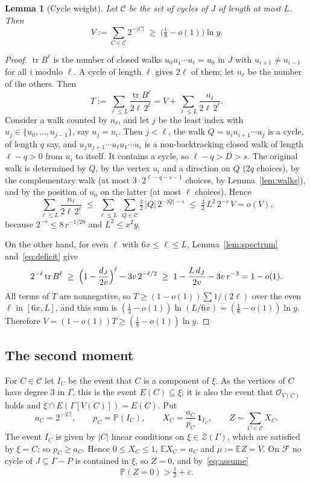 \documentclass[11pt]{article}
\newtheorem{lemma}[theorem]{Lemma}
\theoremstyle{definition}
\theoremstyle{remark}
\newcommand{\Z}{\mathcal{Z}}
\newcommand{\PP}{\mathbb{P}}
\newcommand{\EE}{\mathbb{E}}
\newcommand{\tr}{\operatorname{tr}}
\newcommand{\cO}{\mathcal{O}}
\begin{document}
\begin{lemma}[Cycle weight]\label{lem:weight}
Let $\mathcal{C}$ be the set of cycles of $J$ of length at most $L$. Then
\[
  V:=\sum_{C\in\mathcal{C}}2^{-|C|}\;\ge\;\bigl(\tfrac18-o(1)\bigr)\ln y .
\]
\end{lemma}

\begin{proof}
$\tr B^{\ell}$ is the number of closed walks $u_0u_1\cdots u_\ell=u_0$ in $J$ with
$u_{i+1}\ne u_{i-1}$ for all $i$ modulo $\ell$. A cycle of length $\ell$ gives $2\ell$ of them; let
$n_\ell$ be the number of the others. Then
\[
  T:=\sum_{\ell\le L}\frac{\tr B^{\ell}}{2\ell\,2^{\ell}}=V+\sum_{\ell\le L}\frac{n_\ell}{2\ell\,2^{\ell}} .
\]
Consider a walk counted by $n_\ell$, and let $j$ be the least index with
$u_j\in\{u_0,\dots,u_{j-1}\}$, say $u_j=u_i$. Then $j<\ell$, the walk $Q=u_iu_{i+1}\cdots u_j$ is a
cycle, of length $q$ say, and $u_ju_{j+1}\cdots u_\ell u_1\cdots u_i$ is a non-backtracking closed
walk of length $\ell-q>0$ from $u_i$ to itself. It contains a cycle, so $\ell-q>D>s$. The original
walk is determined by $Q$, by the vertex $u_i$ and a direction on $Q$ ($2q$ choices), by the
complementary walk (at most $3\cdot2^{\ell-q-s-1}$ choices, by Lemma~\ref{lem:walks}), and by the
position of $u_0$ on the latter (at most $\ell$ choices). Hence
\[
  \sum_{\ell\le L}\frac{n_\ell}{2\ell\,2^{\ell}}
  \;\le\;\sum_{\ell\le L}\ \sum_{Q\in\mathcal{C}}\tfrac32\,|Q|\,2^{-|Q|-s}
  \;\le\;\tfrac32\,L^{2}\,2^{-s}\,V=o(V),
\]
because $2^{-s}\le8\,r^{-1/20}$ and $L^{2}\le x^{2}y$.

On the other hand, for even $\ell$ with $6x\le\ell\le L$, Lemma~\ref{lem:spectrum}
and~\eqref{eq:deficit} give
\[
  2^{-\ell}\tr B^{\ell}\;\ge\;\Bigl(1-\frac{d_J}{2v}\Bigr)^{\ell}-3v\,2^{-\ell/2}
  \;\ge\;1-\frac{L\,d_J}{2v}-3v\,r^{-3}=1-o(1).
\]
All terms of $T$ are nonnegative, so $T\ge(1-o(1))\sum1/(2\ell)$ over the even $\ell$ in $[6x,L]$,
and this sum is $(\frac14-o(1))\ln(L/6x)=(\frac18-o(1))\ln y$. Therefore
$V=(1-o(1))T\ge(\frac18-o(1))\ln y$.
\end{proof}

\subsection{The second moment}

For $C\in\mathcal{C}$ let $I_C$ be the event that $C$ is a component of $\xi$. As the vertices of
$C$ have degree $3$ in $\Gamma$, this is the event $E(C)\subseteq\xi$; it is also the event that
$\cO_{V(C)}$ holds and $\xi\cap E(\Gamma[V(C)])=E(C)$. Put
\[
  a_C=2^{-|C|},\qquad p_C=\PP(I_C),\qquad X_C=\frac{a_C}{p_C}\,\mathbf{1}_{I_C},\qquad
  Z=\sum_{C\in\mathcal{C}}X_C .
\]
The event $I_C$ is given by $|C|$ linear conditions on $\xi\in\Z(\Gamma)$, which are satisfied by
$\xi=C$; so $p_C\ge a_C$. Hence $0\le X_C\le1$, $\EE X_C=a_C$ and $\mu:=\EE Z=V$. On $\mathcal{F}$
no cycle of $J\subseteq\Gamma-P$ is contained in $\xi$, so $Z=0$, and by~\eqref{eq:assume}
\begin{equation}\label{eq:Zzero}
  \PP(Z=0)>\tfrac12+\varepsilon .
\end{equation}
\end{document}
